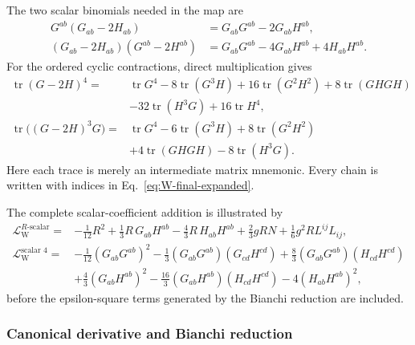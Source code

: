\documentclass[11pt]{article}
\newcommand{\cL}{\mathcal L}
\newcommand{\Weyl}{\mathrm W}
\begin{document}
The two scalar binomials needed in the map are
\begin{align}
G^{ab}(G_{ab}-2H_{ab})&=G_{ab}G^{ab}-2G_{ab}H^{ab},\\
(G_{ab}-2H_{ab})(G^{ab}-2H^{ab})
&=G_{ab}G^{ab}-4G_{ab}H^{ab}+4H_{ab}H^{ab}.
\end{align}
For the ordered cyclic contractions, direct multiplication gives
\begin{align}
\operatorname{tr}(G-2H)^4={}&\operatorname{tr}G^4
-8\operatorname{tr}(G^3H)+16\operatorname{tr}(G^2H^2)
+8\operatorname{tr}(GHGH)
\nonumber\\
&-32\operatorname{tr}(H^3G)+16\operatorname{tr}H^4,\\
\operatorname{tr}\big((G-2H)^3G\big)={}&\operatorname{tr}G^4
-6\operatorname{tr}(G^3H)+8\operatorname{tr}(G^2H^2)
\nonumber\\
&+4\operatorname{tr}(GHGH)-8\operatorname{tr}(H^3G).
\end{align}
Here each trace is merely an intermediate matrix mnemonic.  Every chain is
written with indices in Eq.~\eqref{eq:W-final-expanded}.

The complete scalar-coefficient addition is illustrated by
\begin{align}
\cL_{\Weyl}^{R\text{-scalar}}={}&
-\frac1{12}R^2+\frac13R\,G_{ab}H^{ab}
-\frac43R\,H_{ab}H^{ab}
+\frac23gRN+\frac16g^2R L^{ij}L_{ij},
\label{eq:W-Rscalar}\\
\cL_{\Weyl}^{\text{scalar }4}={}&
-\frac1{12}(G_{ab}G^{ab})^2
-\frac13(G_{ab}G^{ab})(G_{cd}H^{cd})
+\frac83(G_{ab}G^{ab})(H_{cd}H^{cd})
\nonumber\\
&+\frac43(G_{ab}H^{ab})^2
-\frac{16}{3}(G_{ab}H^{ab})(H_{cd}H^{cd})
-4(H_{ab}H^{ab})^2,
\label{eq:W-scalar4-raw}
\end{align}
before the epsilon-square terms generated by the Bianchi reduction are
included.

\subsubsection{Canonical derivative and Bianchi reduction}
\end{document}
